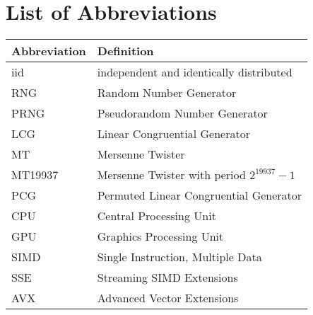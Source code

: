 \documentclass{stdlocal}
\begin{document}
  \section*{List of Abbreviations}

  \begin{table}[H]
    \center
    \renewcommand{\arraystretch}{1.3}
    \begin{tabularx}{\textwidth}{lX}
      \hline
      \textbf{Abbreviation} & \textbf{Definition} \\
      \hline
      \hline
      iid & independent and identically distributed \\
      RNG & Random Number Generator \\
      PRNG & Pseudorandom Number Generator \\
      LCG & Linear Congruential Generator \\
      MT & Mersenne Twister \\
      MT19937 & Mersenne Twister with period $2^{19937}-1$ \\
      PCG & Permuted Linear Congruential Generator \\
      CPU & Central Processing Unit \\
      GPU & Graphics Processing Unit \\
      SIMD & Single Instruction, Multiple Data \\
      SSE & Streaming SIMD Extensions \\
      AVX & Advanced Vector Extensions \\
      \hline
    \end{tabularx}
  \end{table}
\end{document}
